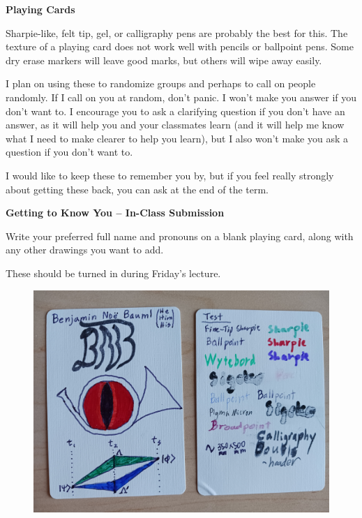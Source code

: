 \documentclass[]{article}
\begin{document}
\begin{TeacherMargin}
\noindent\textbf{Playing Cards}

Sharpie-like, felt tip, gel, or calligraphy pens are probably the best for this. The texture of a playing card does not work well with pencils or ballpoint pens. Some dry erase markers will leave good marks, but others will wipe away easily.

I plan on using these to randomize groups and perhaps to call on people randomly. If I call on you at random, don't panic. I won't make you answer if you don't want to. I encourage you to ask a clarifying question if you don't have an answer, as it will help you and your classmates learn (and it will help me know what I need to make clearer to help you learn), but I also won't make you ask a question if you don't want to.

I would like to keep these to remember you by, but if you feel really strongly about getting these back, you can ask at the end of the term.
\end{TeacherMargin}
\begin{PresentSpace}
\begin{center}
	\textbf{Getting to Know You -- In-Class Submission}
\end{center}
Write your preferred full name and pronouns on a blank playing card, along with any other drawings you want to add.

\noindent These should be turned in during Friday's lecture. \\
\begin{figure}[h]
	\centering
	\includegraphics[scale=0.1]{PlayingCards}
\end{figure}
\end{PresentSpace}
\end{document}
